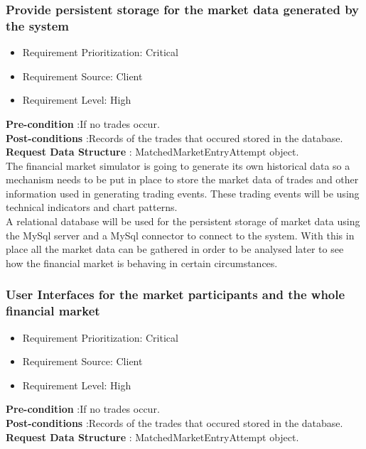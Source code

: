 \documentclass[12pt]{article}
\begin{document}
				\subsubsection{Provide persistent storage for the market data generated by the system}
								\begin{itemize}
									\item Requirement Prioritization: Critical
									\item Requirement Source: Client 
									\item Requirement Level: High	
								\end{itemize}
								
								\textbf{Pre-condition} :If no trades occur.\\
								\textbf{Post-conditions} :Records of the trades that occured stored in the database.\\ 
							 	\textbf{Request Data Structure} : MatchedMarketEntryAttempt object.\\
							 	
								The financial market simulator is going to generate its own historical data so a mechanism needs to be put in place to store the market data of trades and other information used in generating trading events. These trading events will be using technical indicators and chart patterns.\\
								
								A relational database will be used for the persistent storage of market data using the MySql server and a MySql connector to connect to the system. With this in place all the market data can be gathered in order to be analysed later to see how the financial market is behaving in certain circumstances.
								
				\subsubsection{User Interfaces for the market participants and the whole financial market}
								\begin{itemize}
									\item Requirement Prioritization: Critical
									\item Requirement Source: Client 
									\item Requirement Level: High	
								\end{itemize}
								
								\textbf{Pre-condition} :If no trades occur.\\
								\textbf{Post-conditions} :Records of the trades that occured stored in the database.\\ 
								\textbf{Request Data Structure} : MatchedMarketEntryAttempt object.\\
									
\end{document}
